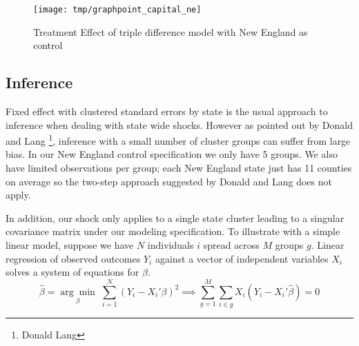 \documentclass[12pt]{article}
\begin{document}
\begin{figure}[H]
	\centering
	\texttt{[image: tmp/graphpoint\_capital\_ne]}
	\caption{Treatment Effect of triple difference model with New England as control}
	\label{fig:ddd}
\end{figure}

\begin{comment}
\begin{figure}[H]
	\centering
	\begin{subfigure}[b]{0.495\textwidth}
		\texttt{[image: resources/graphpoint\_diff\_ne\_pop\_ddd\_synth]}
		\caption{Non-Employers}
	\end{subfigure}
		\begin{subfigure}[b]{0.495\textwidth}
		\texttt{[image: resources/graphpoint\_diff\_em\_pop\_ddd\_synth]}
		\caption{Small businesses}
	\end{subfigure}
	\caption{Treatment Effect of triple difference model with synthetic control}
\end{figure}
\end{comment}

\subsection{Inference}

Fixed effect with clustered standard errors by state is the usual approach to inference when dealing with state wide shocks. However as pointed out by Donald and Lang \footnote{Donald Lang}, inference with a small number of cluster groups can suffer from large bias. In our New England control specification we only have 5 groups. We also have limited observations per group; each New England state just has 11 counties on average so the two-step approach suggested by Donald and Lang does not apply. 

In addition, our shock only applies to a single state cluster leading to a singular covariance matrix under our modeling specification. To illustrate with a simple linear model, suppose we have $N$ individuals $i$ spread across $M$ groups $g$. Linear regression of observed outcomes $Y_i$ against a vector of independent variables $X_i$ solves a system of equations for $\beta$. 
$$ \hat{\beta} = \underset{\beta}{\arg \min} \; \sum_{i=1}^{N} (Y_i - X_i' \beta)^2 \implies \sum_{g=1}^{M} \sum_{i \in g} X_i(Y_i - X_i' \hat{\beta}) = 0$$
\end{document}
